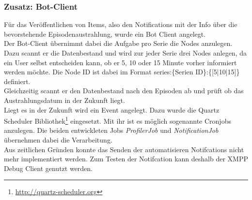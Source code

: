 \newpage

\subsubsection{Zusatz: Bot-Client}

Für das Veröffentlichen von Items, also den Notifications mit der Info über die bevorstehende Episodenaustrahlung, wurde ein Bot Client angelegt.\\
Der Bot-Client übernimmt dabei die Aufgabe pro Serie die Nodes anzulegen. Dazu scannt er die Datenbestand und wird zur jeder Serie drei Nodes anlegen, da ein User selbst entscheiden kann, ob er 5, 10 oder 15 Minute vorher informiert werden möchte. Die Node ID ist dabei im Format \textsf{series:\{Serien ID\}:\{[5|10|15]\}} definiert.\\
Gleichzeitig scannt er den Datenbestand nach den Episoden ab und prüft ob das Austrahlungsdatum in der Zukunft liegt.\\
Liegt es in der Zukunft wird ein Event angelegt. Dazu wurde die Quartz Scheduler Bibliothek\footnote{\url{http://quartz-scheduler.org}} eingesetzt. Mit ihr ist es möglich sogenannte Cronjobs anzulegen. Die beiden entwickleten Jobs \textit{ProfilerJob} und \textit{NotificationJob} übernehmen dabei die Verarbeitung.\\

Aus zeitlichen Gründen konnte  das Senden der automatisieren Notifcations nicht mehr implementiert werden. Zum Testen der Notifcation kann deshalb der XMPP Debug Client genutzt werden.
